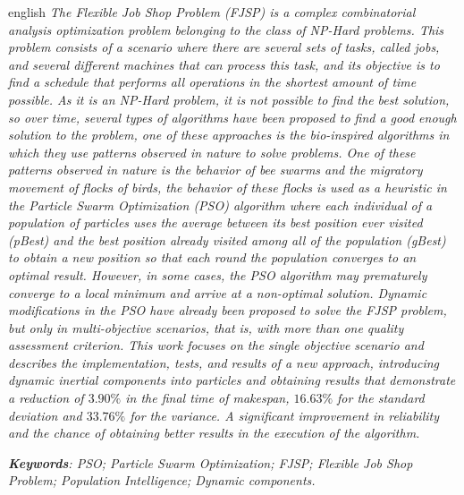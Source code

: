 \par

\begin{resumo}[Abstract]
  \begin{otherlanguage*}{english}
    \emph{
      The \textit{Flexible Job Shop Problem} (FJSP) is a complex combinatorial analysis optimization problem belonging to the class of NP-Hard problems. This problem consists of a scenario where there are several sets of tasks, called \textit{jobs}, and several different machines that can process this task, and its objective is to find a schedule that performs all operations in the shortest amount of time possible. As it is an NP-Hard problem, it is not possible to find the best solution, so over time, several types of algorithms have been proposed to find a good enough solution to the problem, one of these approaches is the bio-inspired algorithms in which they use patterns observed in nature to solve problems. One of these patterns observed in nature is the behavior of bee swarms and the migratory movement of flocks of birds, the behavior of these flocks is used as a heuristic in the \textit{Particle Swarm Optimization} (PSO) algorithm where each individual of a population of particles uses the average between its best position ever visited (\textit{pBest}) and the best position already visited among all of the population (\textit{gBest}) to obtain a new position so that each round the population converges to an optimal result. However, in some cases, the PSO algorithm may prematurely converge to a local minimum and arrive at a non-optimal solution. Dynamic modifications in the PSO have already been proposed to solve the FJSP problem, but only in multi-objective scenarios, that is, with more than one quality assessment criterion. This work focuses on the single objective scenario and describes the implementation, tests, and results of a new approach, introducing dynamic inertial components into particles and obtaining results that demonstrate a reduction of $3.90\%$ in the final time of \textit{makespan}, $16.63\%$ for the standard deviation and $33.76\%$ for the variance. A significant improvement in reliability and the chance of obtaining better results in the execution of the algorithm.
    }
    \vspace{\onelineskip}

    \noindent
    \emph{	
      \textbf{Keywords}: PSO; Particle Swarm Optimization; FJSP; Flexible Job Shop Problem; Population Intelligence; Dynamic components.
    }
  \end{otherlanguage*}
\end{resumo}
